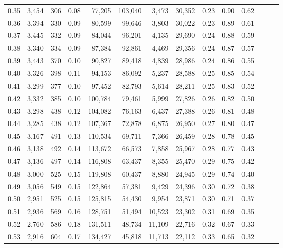 \begin{tabular}{rrrrrrrrrrrrrr}
0.35 &  3,454 &  306 &  0.08 &   77,205 &  103,040 &   3,473 &  30,352 &  0.23 &  0.90 &      0.62 \\
0.36 &  3,394 &  330 &  0.09 &   80,599 &   99,646 &   3,803 &  30,022 &  0.23 &  0.89 &      0.61 \\
0.37 &  3,445 &  332 &  0.09 &   84,044 &   96,201 &   4,135 &  29,690 &  0.24 &  0.88 &      0.59 \\
0.38 &  3,340 &  334 &  0.09 &   87,384 &   92,861 &   4,469 &  29,356 &  0.24 &  0.87 &      0.57 \\
0.39 &  3,443 &  370 &  0.10 &   90,827 &   89,418 &   4,839 &  28,986 &  0.24 &  0.86 &      0.55 \\
0.40 &  3,326 &  398 &  0.11 &   94,153 &   86,092 &   5,237 &  28,588 &  0.25 &  0.85 &      0.54 \\
0.41 &  3,299 &  377 &  0.10 &   97,452 &   82,793 &   5,614 &  28,211 &  0.25 &  0.83 &      0.52 \\
0.42 &  3,332 &  385 &  0.10 &  100,784 &   79,461 &   5,999 &  27,826 &  0.26 &  0.82 &      0.50 \\
0.43 &  3,298 &  438 &  0.12 &  104,082 &   76,163 &   6,437 &  27,388 &  0.26 &  0.81 &      0.48 \\
0.44 &  3,285 &  438 &  0.12 &  107,367 &   72,878 &   6,875 &  26,950 &  0.27 &  0.80 &      0.47 \\
0.45 &  3,167 &  491 &  0.13 &  110,534 &   69,711 &   7,366 &  26,459 &  0.28 &  0.78 &      0.45 \\
0.46 &  3,138 &  492 &  0.14 &  113,672 &   66,573 &   7,858 &  25,967 &  0.28 &  0.77 &      0.43 \\
0.47 &  3,136 &  497 &  0.14 &  116,808 &   63,437 &   8,355 &  25,470 &  0.29 &  0.75 &      0.42 \\
0.48 &  3,000 &  525 &  0.15 &  119,808 &   60,437 &   8,880 &  24,945 &  0.29 &  0.74 &      0.40 \\
0.49 &  3,056 &  549 &  0.15 &  122,864 &   57,381 &   9,429 &  24,396 &  0.30 &  0.72 &      0.38 \\
0.50 &  2,951 &  525 &  0.15 &  125,815 &   54,430 &   9,954 &  23,871 &  0.30 &  0.71 &      0.37 \\
0.51 &  2,936 &  569 &  0.16 &  128,751 &   51,494 &  10,523 &  23,302 &  0.31 &  0.69 &      0.35 \\
0.52 &  2,760 &  586 &  0.18 &  131,511 &   48,734 &  11,109 &  22,716 &  0.32 &  0.67 &      0.33 \\
0.53 &  2,916 &  604 &  0.17 &  134,427 &   45,818 &  11,713 &  22,112 &  0.33 &  0.65 &      0.32 \\

\end{tabular}
